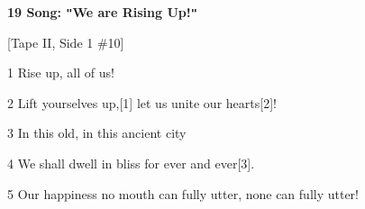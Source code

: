 
\textbf{19 Song: \texttt{"}We are Rising Up!\texttt{"}}

[Tape II, Side 1 \#10]

1 Rise up, all of us!

2 Lift yourselves up,[1] let us unite our hearts[2]!

3 In this old, in this ancient city

4 We shall dwell in bliss for ever and ever[3].

5 Our happiness no mouth can fully utter, none can fully utter!

